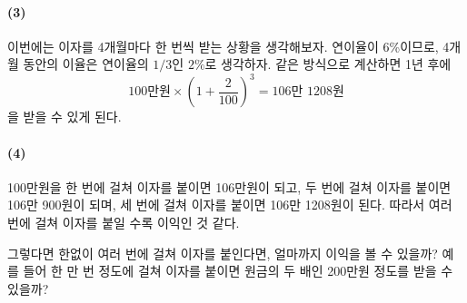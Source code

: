\documentclass{article}
\begin{document}
\paragraph{(3)}
이번에는 이자를 4개월마다 한 번씩 받는 상황을 생각해보자.
연이율이 6\%이므로, 4개월 동안의 이율은 연이율의 \(1/3\)인 \(2\%\)로 생각하자.
같은 방식으로 계산하면 1년 후에
\[100\text{만원}\times\left(1+\frac2{100}\right)^3=106\text{만 }1208\text{원}\]
을 받을 수 있게 된다.

\paragraph{(4)}
100만원을 한 번에 걸쳐 이자를 붙이면 106만원이 되고, 두 번에 걸쳐 이자를 붙이면 106만 900원이 되며, 세 번에 걸쳐 이자를 붙이면 106만 1208원이 된다.
따라서 여러 번에 걸쳐 이자를 붙일 수록 이익인 것 같다.

그렇다면 한없이 여러 번에 걸쳐 이자를 붙인다면, 얼마까지 이익을 볼 수 있을까?
예를 들어 한 만 번 정도에 걸쳐 이자를 붙이면 원금의 두 배인 200만원 정도를 받을 수 있을까?
\end{document}
